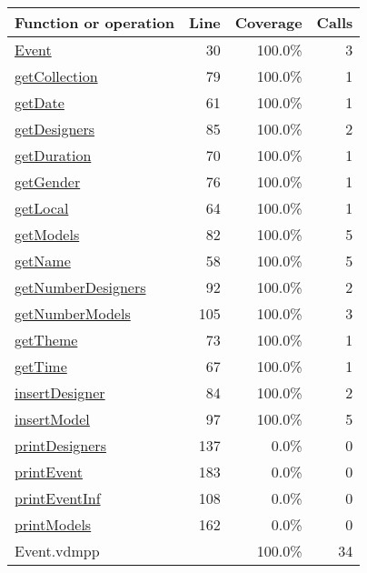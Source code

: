 \begin{longtable}{|l|r|r|r|}
\hline
Function or operation & Line & Coverage & Calls \\
\hline
\hline
\hyperref[Event:30]{Event} & 30&100.0\% & 3 \\
\hline
\hyperref[getCollection:79]{getCollection} & 79&100.0\% & 1 \\
\hline
\hyperref[getDate:61]{getDate} & 61&100.0\% & 1 \\
\hline
\hyperref[getDesigners:85]{getDesigners} & 85&100.0\% & 2 \\
\hline
\hyperref[getDuration:70]{getDuration} & 70&100.0\% & 1 \\
\hline
\hyperref[getGender:76]{getGender} & 76&100.0\% & 1 \\
\hline
\hyperref[getLocal:64]{getLocal} & 64&100.0\% & 1 \\
\hline
\hyperref[getModels:82]{getModels} & 82&100.0\% & 5 \\
\hline
\hyperref[getName:58]{getName} & 58&100.0\% & 5 \\
\hline
\hyperref[getNumberDesigners:92]{getNumberDesigners} & 92&100.0\% & 2 \\
\hline
\hyperref[getNumberModels:105]{getNumberModels} & 105&100.0\% & 3 \\
\hline
\hyperref[getTheme:73]{getTheme} & 73&100.0\% & 1 \\
\hline
\hyperref[getTime:67]{getTime} & 67&100.0\% & 1 \\
\hline
\hyperref[insertDesigner:84]{insertDesigner} & 84&100.0\% & 2 \\
\hline
\hyperref[insertModel:97]{insertModel} & 97&100.0\% & 5 \\
\hline
\hyperref[printDesigners:137]{printDesigners} & 137&0.0\% & 0 \\
\hline
\hyperref[printEvent:183]{printEvent} & 183&0.0\% & 0 \\
\hline
\hyperref[printEventInf:108]{printEventInf} & 108&0.0\% & 0 \\
\hline
\hyperref[printModels:162]{printModels} & 162&0.0\% & 0 \\
\hline
\hline
Event.vdmpp & & 100.0\% & 34 \\
\hline
\end{longtable}

